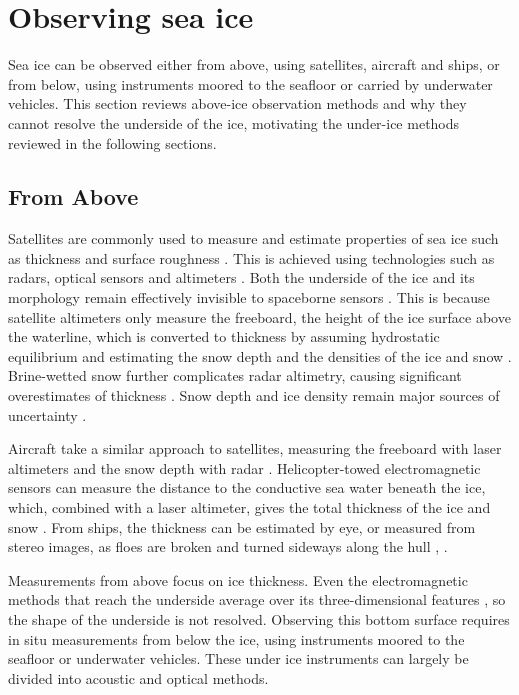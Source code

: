 \section{Observing sea ice}
\label{sec:ch2.observing_sea_ice}
Sea ice can be observed either from above, using satellites, aircraft and ships, or from below, using instruments
moored to the seafloor or carried by underwater vehicles. This section reviews above-ice observation methods and why they cannot
resolve the underside of the ice, motivating the under-ice methods reviewed in the following sections.

\subsection{From Above}

Satellites are commonly used to measure and estimate properties of sea ice such as thickness and surface roughness
\cite{sandvenSeaIceRemote2023}. This is achieved using technologies such as radars, optical sensors and altimeters \cite{sandvenSeaIceRemote2023}.
Both the underside of the ice and its morphology remain effectively invisible to spaceborne sensors \cite{zygmuntowskaUncertaintiesArcticSea2014}.
This is because satellite altimeters only measure the freeboard, the height of the ice surface above the waterline,
which is converted to thickness by assuming hydrostatic equilibrium and estimating the snow depth and the densities of the ice and snow
\cite{zygmuntowskaUncertaintiesArcticSea2014,markusIceCloudLand2017}.
Brine-wetted snow further complicates radar altimetry, causing significant 
overestimates of thickness \cite{nandanSnowPropertyControls2020}. Snow depth 
and ice density remain major sources of uncertainty \cite{zygmuntowskaUncertaintiesArcticSea2014}.


Aircraft take a similar approach to satellites, measuring the freeboard with laser altimeters and the snow depth with radar \cite{kwokThreeYearsSea2018}. Helicopter-towed electromagnetic sensors can measure the
distance to the conductive sea water beneath the ice, which, combined with a laser altimeter, gives the total thickness of the
ice and snow \cite{haasHelicopterborneMeasurementsSea2009}. From ships, the thickness can be
estimated by eye, or measured from stereo images, as floes are broken and turned sideways along the hull \cite{worbyThicknessDistributionAntarctic2008},
 \cite{niiokaSeaIceThickness2010Link}.

Measurements from above focus on ice thickness. Even the electromagnetic methods that reach the underside average
over its three-dimensional features \cite{haasHelicopterborneMeasurementsSea2009}, so the shape of the underside is not resolved.
Observing this bottom surface requires in situ measurements from below the ice, using instruments moored
to the seafloor or underwater vehicles. These under ice instruments can largely be divided into acoustic and optical
methods.
 

